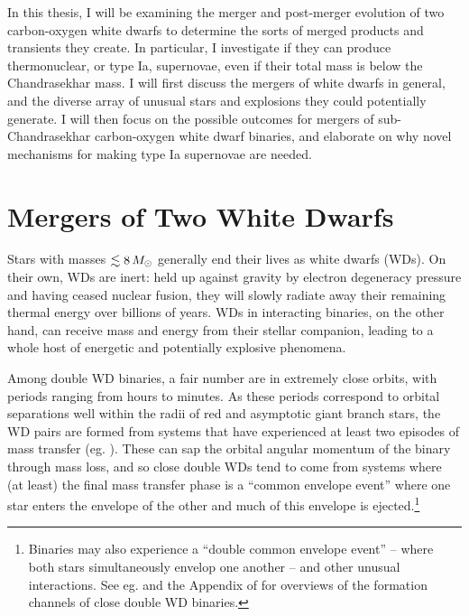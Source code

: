 In this thesis, I will be examining the merger and post-merger evolution of two carbon-oxygen white dwarfs to determine the sorts of merged products and transients they create.  In particular, I investigate if they can produce thermonuclear, or type Ia, supernovae, even if their total mass is below the Chandrasekhar mass.  I will first discuss the mergers of white dwarfs in general, and the diverse array of unusual stars and explosions they could potentially generate.  I will then focus on the possible outcomes for mergers of sub-Chandrasekhar carbon-oxygen white dwarf binaries, and elaborate on why novel mechanisms for making type Ia supernovae are needed.


\section{Mergers of Two White Dwarfs}
\label{sec:c1_wdmergers}

Stars with masses $\lesssim8\,\Msun$ generally end their lives as white dwarfs (WDs).  On their own, WDs are inert: held up against gravity by electron degeneracy pressure and having ceased nuclear fusion, they will slowly radiate away their remaining thermal energy over billions of years.  WDs in interacting binaries, on the other hand, can receive mass and energy from their stellar companion, leading to a whole host of energetic and potentially explosive phenomena.


Among double WD binaries, a fair number are in extremely close orbits, with periods ranging from hours to minutes.  As these periods correspond to orbital separations well within the radii of red and asymptotic giant branch stars, the WD pairs are formed from systems that have experienced at least two episodes of mass transfer (eg. \citealt{nele+01a, toonnp12, toon+14}).  These can sap the orbital angular momentum of the binary through mass loss, and so close double WDs tend to come from systems where (at least) the final mass transfer phase is a ``common envelope event'' where one star enters the envelope of the other and much of this envelope is ejected.\footnote{Binaries may also experience a ``double common envelope event'' -- where both stars simultaneously envelop one another -- and other unusual interactions.  See eg. \cite{toonnp12} and the Appendix of \cite{toon+14} for overviews of the formation channels of close double WD binaries.}

